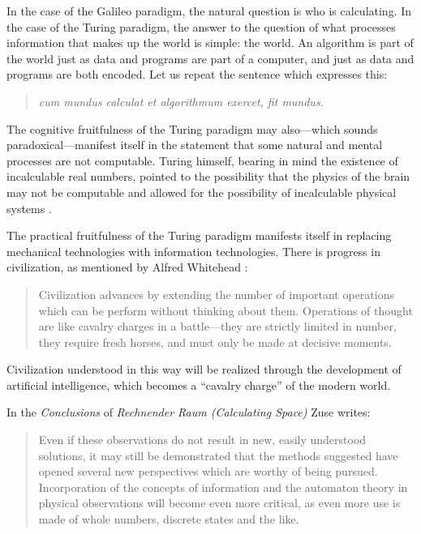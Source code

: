 \documentclass[pdftex,12pt]{article}
\begin{document}
In the case of the Galileo paradigm, the natural question is who is calculating. In the case of the Turing paradigm, the answer to the question of what processes information that makes up the world is simple: the world. An algorithm is part of the world just as data and programs are part of a computer, and just as data and programs are both encoded. Let us repeat the sentence which expresses this: \begin{quote} \small \emph{cum mundus calculat et algorithmum exercet, fit mundus.} \end{quote}

The cognitive fruitfulness of the Turing paradigm may also---which sounds paradoxical---manifest itself in the statement that some natural and mental processes are not computable. Turing himself, bearing in mind the existence of incalculable real numbers, pointed to the possibility that the physics of the brain may not be computable and allowed for the possibility of incalculable physical systems \parencite[paragraph: ``The physical computability thesis'']{CopelandSprevakShagrir2017}.

The practical fruitfulness of the Turing paradigm manifests itself in replacing mechanical technologies with information technologies.  There is progress in civilization, as mentioned by Alfred Whitehead \parencite*[p.61]{Whitehead1911}: \begin{quote} \small Civilization advances by extending the number of important operations which can be perform without thinking about them. Operations of thought are like cavalry charges in a battle---they are strictly limited in number, they require fresh horses, and must only be made at decisive moments. \end{quote} Civilization understood in this way will be realized through the development of artificial intelligence, which becomes a ``cavalry charge'' of the modern world.

In the \emph{Conclusions} of \emph{Rechnender Raum (Calculating Space)} Zuse writes: \begin{quote} \small Even if these observations do not result in new, easily understood solutions, it may still be demonstrated that the methods suggested have opened several new perspectives which are worthy of being pursued. Incorporation of the
concepts of information and the automaton theory in physical observations will become even more critical, as even more use is made of whole numbers, discrete states and the like. \end{quote}
\end{document}
